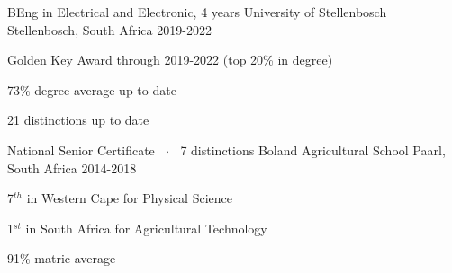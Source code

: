 

\begin{cventries}

  \cventry
    {BEng in Electrical and Electronic, 4 years} %
    {University of Stellenbosch} %
    {Stellenbosch, South Africa} %
    {2019-2022} %
    {
      \begin{cvitems} %
        \item {Golden Key Award through 2019-2022 (top 20\% in degree)}
        \item {73\% degree average up to date}
        \item {21 distinctions up to date}
      \end{cvitems}
    }
  \cventry
{National Senior Certificate ${\enskip\cdotp\enskip}$ 7 distinctions} %
{Boland Agricultural School } %
{Paarl, South Africa} %
{2014-2018} %
{
	  \begin{cvitems} %
	  	\item {7$^{th}$ in Western Cape for Physical Science}
	  	\item {1$^{st}$ in South Africa for Agricultural Technology}
	  	\item {91\% matric average }
	  \end{cvitems}
}

\end{cventries}
